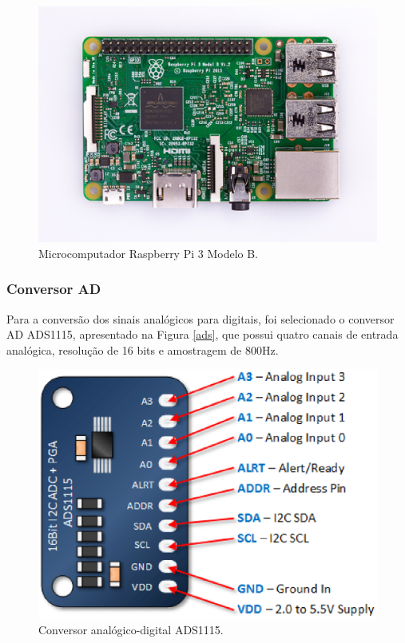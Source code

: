 \begin{figure}[H]
  \centering
    \includegraphics[keepaspectratio=true,scale=0.6]{figuras/rasp.eps}
  \caption{Microcomputador Raspberry Pi 3 Modelo B.}
  \label{fig:rasp}
\end{figure}

\subsubsection{Conversor AD}
Para a conversão dos sinais analógicos para digitais, foi selecionado o conversor 
AD ADS1115, apresentado na Figura \ref{ads}, que possui quatro canais de entrada analógica, resolução de 16 bits 
e amostragem de 800Hz. 

\begin{figure}[H]
  \centering
    \includegraphics[keepaspectratio=true,scale=0.7]{figuras/ads.eps}
  \caption{Conversor analógico-digital ADS1115.}
  \label{fig:ads}
\end{figure}

